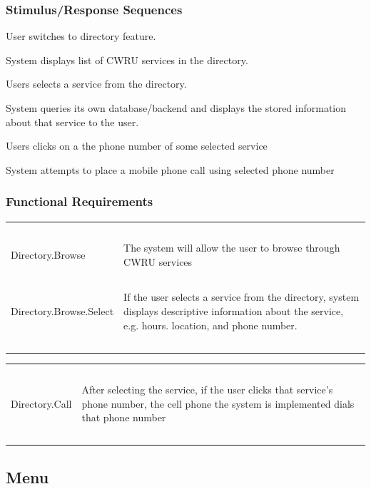 \documentclass[pdftex,12pt,letter]{article}
\begin{document}
\subsubsection{Stimulus/Response Sequences}
\begin{description}\itemsep1pt
\item[Stimulus:] User switches to directory feature.
\item[Response:] System displays list of CWRU services in the directory.
\item[Stimulus:] Users selects a service from the directory.
\item[Response:] System queries its own database/backend and displays the stored information about that service to the user.
\item[Stimulus:] Users clicks on a the phone number of some selected service
\item[Response:] System attempts to place a mobile phone call using selected phone number
\end{description}
\subsubsection{Functional Requirements}
\begin{table}[!h]
\begin{tabularx}{\textwidth }[t]{|l Y|}
\hline
~&~\\
Directory.Browse & The system will allow the user to browse through CWRU services\\ 
~&~\\
Directory.Browse.Select & If the user selects a service from the directory, system displays descriptive information about the service, e.g. hours. location, and phone number.\\
~&~\\
\hline
\end{tabularx}
\end{table}
\begin{table}[!h]
\begin{tabularx}{\textwidth }[t]{|l Y|}
\hline
~&~\\
Directory.Call & After selecting the service, if the user clicks that service's phone number, the cell phone the system is implemented dials that phone number\\
~&~\\
\hline
\end{tabularx}
\end{table}
\FloatBarrier
\subsection{Menu}
\end{document}

